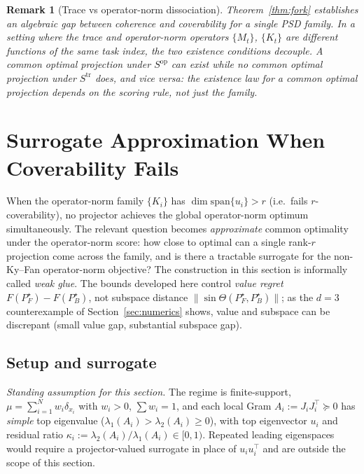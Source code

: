\documentclass[final,3p,times]{elsarticle}
\newtheorem{remark}[theorem]{Remark}
\begin{document}
\begin{remark}[Trace vs operator-norm dissociation]
\label{rem:dissoc}
Theorem~\ref{thm:fork} establishes an algebraic gap between coherence and
coverability for a single PSD family.
In a setting where the trace and operator-norm operators
$\{M_t\}$, $\{K_t\}$ are different functions of the same task index, the
two existence conditions decouple.
A common optimal projection under $S^{\mathrm{op}}$ can exist while no
common optimal projection under $S^{\mathrm{tr}}$ does, and vice versa:
the existence law for a common optimal projection depends on the
scoring rule, not just the family.
\end{remark}

\section{Surrogate Approximation When Coverability Fails}
\label{sec:weakglue}

When the operator-norm family $\{K_i\}$ has $\dim\mathrm{span}\{u_i\}>r$
(i.e.\ fails $r$-coverability), no projector achieves the global
operator-norm optimum simultaneously.
The relevant question becomes \emph{approximate} common optimality under
the operator-norm score: how close to optimal can a single rank-$r$
projection come across the family, and is there a tractable surrogate
for the non-Ky--Fan operator-norm objective?
The construction in this section is informally called \emph{weak glue}.
The bounds developed here control \emph{value regret}
$F(P_F^\star)-F(P_B^\star)$, not subspace distance
$\|\sin\Theta(P_F^\star,P_B^\star)\|$; as the $d=3$ counterexample of
Section~\ref{sec:numerics} shows, value and subspace can be discrepant
(small value gap, substantial subspace gap).

\subsection{Setup and surrogate}

\emph{Standing assumption for this section.}
The regime is finite-support, $\mu=\sum_{i=1}^N w_i\delta_{x_i}$ with
$w_i>0$, $\sum w_i=1$, and each local Gram $A_i:=J_iJ_i^\top\succeq 0$
has \emph{simple} top eigenvalue ($\lambda_1(A_i)>\lambda_2(A_i)\ge 0$),
with top eigenvector $u_i$ and residual ratio
$\kappa_i:=\lambda_2(A_i)/\lambda_1(A_i)\in[0,1)$.
Repeated leading eigenspaces would require a projector-valued surrogate
in place of $u_i u_i^\top$ and are outside the scope of this section.
\end{document}
